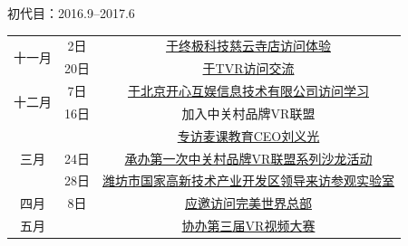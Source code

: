 \begin{section}{初代目：2016.9--2017.6}
\begin{table}[H]
\begin{center}
\begin{tabular}{|c|c|c|}
			\multirow{2}{*}{十一月}
			& 2日 & \href{https://mp.weixin.qq.com/s/zFRpFf-90lzlfQhYlOh0Yw}{于终极科技慈云寺店访问体验} \\
			& 20日 & \href{https://mp.weixin.qq.com/s/WqN5Na-M-45fKG6UV-pSZA}{于TVR访问交流} \\ \hline

			\multirow{2}{*}{十二月}
			& 7日 & \href{https://mp.weixin.qq.com/s/43pTM3BWA1HeuyP2wj4zgA}{于北京开心互娱信息技术有限公司访问学习} \\
			& 16日 & 加入中关村品牌VR联盟 \\ \hline

			\multirow{3}{*}{三月}
			& & \href{https://mp.weixin.qq.com/s/eRU1DgRMs7Z62imheJksYA}{专访麦课教育CEO刘义光} \\
			& 24日 & \href{https://mp.weixin.qq.com/s/7OYzm3obpub49CM9at3wcw}{承办第一次中关村品牌VR联盟系列沙龙活动} \\
			& 28日 & \href{https://mp.weixin.qq.com/s/qWsWQ3jKt6SSnXNCPYzbkA}{潍坊市国家高新技术产业开发区领导来访参观实验室} \\ \hline

			\multirow{1}{*}{四月}
			& 8日 & \href{https://mp.weixin.qq.com/s/fcz9Pao__yQIYgcQhOw7nw}{应邀访问完美世界总部} \\ \hline

			\multirow{1}{*}{五月}
			& & \href{https://mp.weixin.qq.com/s/PNQWssw45hEL54-5yCKsRg}{协办第三届VR视频大赛} \\ \hline
		\end{tabular}
	\end{center}\end{table}
\end{section}